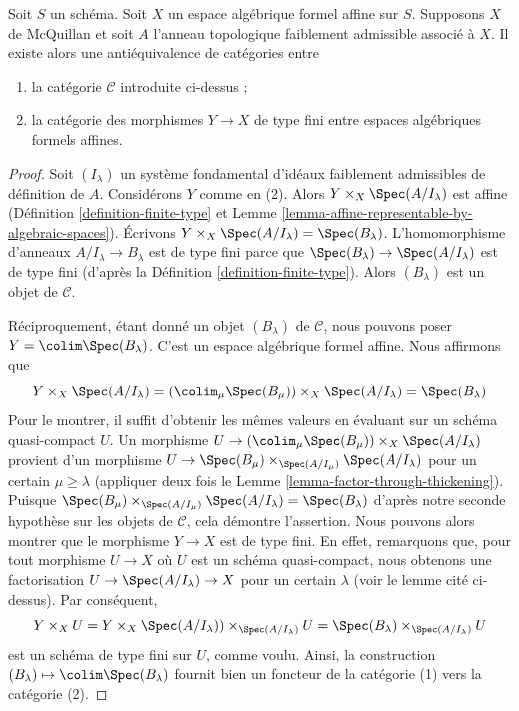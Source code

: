 \begin{lemma}
\label{lemma-category-affine-over}
Soit $S$ un schéma. Soit $X$ un espace algébrique formel affine sur $S$.
Supposons $X$ de McQuillan et soit $A$ l'anneau topologique faiblement
admissible associé à $X$. Il existe alors une antiéquivalence de catégories
entre
\begin{enumerate}
\item la catégorie $\mathcal{C}$ introduite ci-dessus ;
\item la catégorie des morphismes $Y \to X$ de type fini entre
espaces algébriques formels affines.
\end{enumerate}
\end{lemma}

\begin{proof}
Soit $(I_\lambda)$ un système fondamental d'idéaux faiblement admissibles
de définition de $A$. Considérons $Y$ comme en (2). Alors
$Y \times_X \Spec(A/I_\lambda)$ est affine
(Définition \ref{definition-finite-type}
et Lemme \ref{lemma-affine-representable-by-algebraic-spaces}).
Écrivons $Y \times_X \Spec(A/I_\lambda) = \Spec(B_\lambda)$.
L'homomorphisme d'anneaux $A/I_\lambda \to B_\lambda$ est de type fini
parce que $\Spec(B_\lambda) \to \Spec(A/I_\lambda)$ est de
type fini
(d'après la Définition \ref{definition-finite-type}).
Alors $(B_\lambda)$ est un objet de $\mathcal{C}$.

\medskip\noindent
Réciproquement, étant donné un objet $(B_\lambda)$ de $\mathcal{C}$, nous pouvons poser
$Y = \colim \Spec(B_\lambda)$. C'est un espace algébrique formel
affine. Nous affirmons que
$$
Y \times_X \Spec(A/I_\lambda) =
\left(\colim_\mu \Spec(B_\mu)\right) \times_X \Spec(A/I_\lambda) =
\Spec(B_\lambda)
$$
Pour le montrer, il suffit d'obtenir les mêmes valeurs en évaluant
sur un schéma quasi-compact $U$. Un morphisme
$U \to \left(\colim_\mu \Spec(B_\mu)\right) \times_X \Spec(A/I_\lambda)$
provient d'un morphisme
$U \to \Spec(B_\mu) \times_{\Spec(A/I_\mu)} \Spec(A/I_\lambda)$
pour un certain $\mu \geq \lambda$ (appliquer
deux fois le Lemme \ref{lemma-factor-through-thickening}). Puisque
$\Spec(B_\mu) \times_{\Spec(A/I_\mu)} \Spec(A/I_\lambda) = \Spec(B_\lambda)$
d'après notre seconde hypothèse sur les objets de $\mathcal{C}$,
cela démontre l'assertion. Nous pouvons alors montrer que le morphisme
$Y \to X$ est de type fini. En effet, remarquons que,
pour tout morphisme $U \to X$ où $U$ est un schéma quasi-compact, nous obtenons
une factorisation $U \to \Spec(A/I_\lambda) \to X$ pour un certain $\lambda$
(voir le lemme cité ci-dessus). Par conséquent,
$$
Y \times_X U =
Y \times_X \Spec(A/I_\lambda)) \times_{\Spec(A/I_\lambda)} U =
\Spec(B_\lambda) \times_{\Spec(A/I_\lambda)} U
$$
est un schéma de type fini sur $U$, comme voulu. Ainsi, la construction
$(B_\lambda) \mapsto \colim \Spec(B_\lambda)$ fournit bien un foncteur
de la catégorie (1) vers la catégorie (2).


\end{proof}
